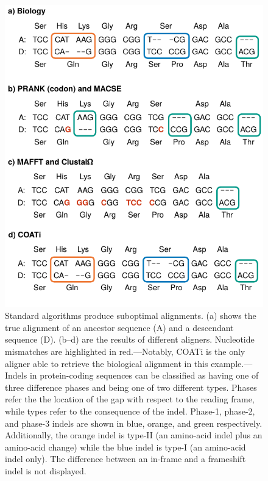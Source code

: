 \documentclass[12pt,letterpaper]{article}
\begin{document}
\begin{figure}[h!]
    \centering%
    \includegraphics[scale=1]{figures/fig-aln.pdf}
    \par
    \caption{
        Standard algorithms produce suboptimal alignments.
        (a) shows the true alignment of an ancestor sequence (A) and a descendant sequence (D).
        (b--d) are the results of different aligners. Nucleotide mismatches are highlighted in red.---Notably, COATi is the only aligner able to retrieve the biological alignment in this example.---%
        Indels in protein-coding sequences can be classified as having one of three difference phases and being one of two different types.
        Phases refer the the location of the gap with respect to the reading frame, while types refer to the consequence of the indel.
        Phase-1, phase-2, and phase-3 indels are shown in blue, orange, and green respectively.
        Additionally, the orange indel is type-II (an amino-acid indel plus an amino-acid change) while the blue indel is type-I (an amino-acid indel only). The difference between an in-frame and a frameshift indel is not displayed.
        }
    \label{fig:aln}
\end{figure}
\end{document}
